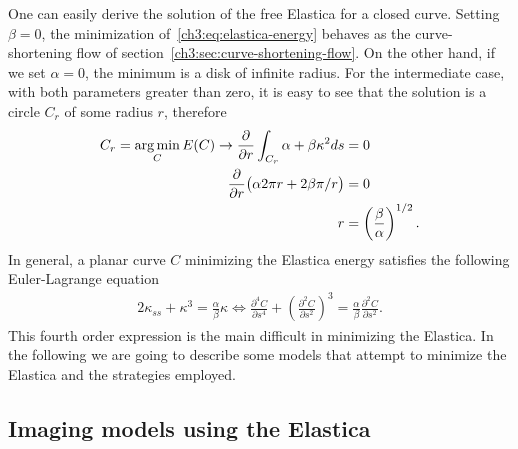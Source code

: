 One can easily derive the solution of the free Elastica for a closed curve. Setting $\beta=0$, the minimization of~\cref{ch3:eq:elastica-energy} behaves as the curve-shortening flow of section~\cref{ch3:sec:curve-shortening-flow}. On the other hand, if we set $\alpha =0$, the minimum is a disk of infinite radius. For the intermediate case, with both parameters greater than zero, it is easy to see that the solution is a circle $C_r$ of some radius $r$, therefore
\begin{align*}
	C_r = \operatorname*{arg\,min}_C E(C) \rightarrow \frac{ \partial}{\partial r} \int_{C_r}{\alpha + \beta \kappa^2 ds} &= 0 \\
	\frac{\partial}{\partial r} \big( \alpha 2\pi r + 2\beta \pi/r \big) & = 0 \\
	r &= \left(\frac{\beta}{\alpha}\right)^{1/2}.
\end{align*}
%
In general, a planar curve $C$ minimizing the Elastica energy satisfies the following Euler-Lagrange equation~\cite{chan02elasticainpainting,singer08lectures}
\begin{align}
		2\kappa_{ss} + \kappa^3 = \frac{\alpha}{\beta}\kappa \Leftrightarrow \frac{\partial ^4 C}{\partial s^4} + \left( \frac{\partial ^2 C}{\partial s^2} \right)^3 = \frac{\alpha}{\beta}\frac{\partial ^2 C}{\partial s^2}.
		\label{ch3:eq:euler-lagrange-equation-elastica}
\end{align}
%
%
This fourth order expression is the main difficult in minimizing the Elastica. In the following we are going to describe some models that attempt to minimize the Elastica and the strategies employed.

\subsection{Imaging models using the Elastica}

